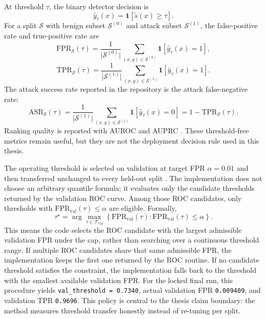 At threshold $\tau$, the binary detector decision is
\begin{equation}
  \hat{y}_{\tau}(x) = \mathbf{1}[\tilde{s}(x) \ge \tau].
\end{equation}
For a split $\mathcal{S}$ with benign subset $\mathcal{S}^{(0)}$ and attack subset $\mathcal{S}^{(1)}$, the false-positive rate and true-positive rate are
\begin{equation}
  \mathrm{FPR}_{\mathcal{S}}(\tau) = \frac{1}{\lvert \mathcal{S}^{(0)} \rvert} \sum_{(x,y) \in \mathcal{S}^{(0)}} \mathbf{1}[\hat{y}_{\tau}(x) = 1],
\end{equation}
\begin{equation}
  \mathrm{TPR}_{\mathcal{S}}(\tau) = \frac{1}{\lvert \mathcal{S}^{(1)} \rvert} \sum_{(x,y) \in \mathcal{S}^{(1)}} \mathbf{1}[\hat{y}_{\tau}(x) = 1].
\end{equation}
The attack success rate reported in the repository is the attack false-negative rate:
\begin{equation}
  \mathrm{ASR}_{\mathcal{S}}(\tau) = \frac{1}{\lvert \mathcal{S}^{(1)} \rvert} \sum_{(x,y) \in \mathcal{S}^{(1)}} \mathbf{1}[\hat{y}_{\tau}(x) = 0] = 1 - \mathrm{TPR}_{\mathcal{S}}(\tau).
\end{equation}
Ranking quality is reported with AUROC and AUPRC \cite{fawcett2006roc}. These threshold-free metrics remain useful, but they are not the deployment decision rule used in this thesis.

The operating threshold is selected on validation at target FPR $\alpha = 0.01$ and then transferred unchanged to every held-out split \cite{guo2017calibration}. The implementation does not choose an arbitrary quantile formula; it evaluates only the candidate thresholds returned by the validation ROC curve. Among those ROC candidates, only thresholds with $\mathrm{FPR}_{\mathrm{val}}(\tau) \le \alpha$ are eligible. Formally,
\begin{equation}
  \tau^{\star} = \arg\max_{\tau \in \mathcal{T}_{\mathrm{val}}} \left\{ \mathrm{FPR}_{\mathrm{val}}(\tau) : \mathrm{FPR}_{\mathrm{val}}(\tau) \le \alpha \right\}.
\end{equation}
This means the code selects the ROC candidate with the largest admissible validation FPR under the cap, rather than searching over a continuous threshold range. If multiple ROC candidates share that same admissible FPR, the implementation keeps the first one returned by the ROC routine. If no candidate threshold satisfies the constraint, the implementation falls back to the threshold with the smallest available validation FPR. For the locked final run, this procedure yields \texttt{val\_threshold = 0.7340}, actual validation FPR \texttt{0.009409}, and validation TPR \texttt{0.9696}. This policy is central to the thesis claim boundary: the method measures threshold transfer honestly instead of re-tuning per split.

